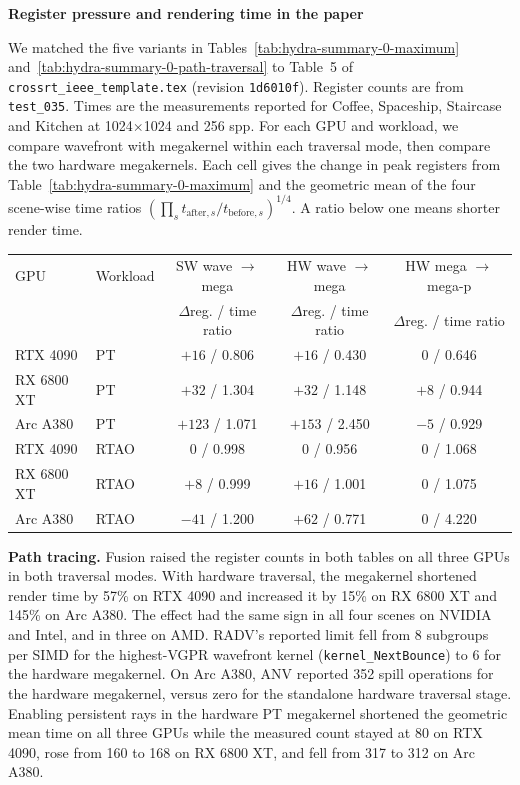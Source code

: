 \par\medskip
\noindent\textbf{Register pressure and rendering time in the paper}\par
We matched the five variants in Tables~\ref{tab:hydra-summary-0-maximum}
and~\ref{tab:hydra-summary-0-path-traversal} to Table~5 of
\texttt{crossrt\_ieee\_template.tex} (revision \texttt{1d6010f}). Register
counts are from \texttt{test\_035}. Times are the measurements reported
for Coffee, Spaceship, Staircase and Kitchen at 1024$\times$1024 and 256 spp.
For each GPU and workload, we compare wavefront with megakernel within each
traversal mode, then compare the two hardware megakernels. Each cell gives
the change in peak registers from Table~\ref{tab:hydra-summary-0-maximum}
and the geometric mean of the four scene-wise time ratios
$(\prod_s t_{\mathrm{after},s}/t_{\mathrm{before},s})^{1/4}$.
A ratio below one means shorter render time.

\begin{center}
\begin{tabular}{llccc}
\hline
GPU & Workload & SW wave $\to$ mega & HW wave $\to$ mega & HW mega $\to$ mega-p \\
    &          & $\Delta$reg. / time ratio & $\Delta$reg. / time ratio & $\Delta$reg. / time ratio \\
\hline
RTX 4090   & PT   & $+16$ / 0.806 & $+16$ / 0.430 & $0$ / 0.646 \\
RX 6800 XT & PT   & $+32$ / 1.304 & $+32$ / 1.148 & $+8$ / 0.944 \\
Arc A380   & PT   & $+123$ / 1.071 & $+153$ / 2.450 & $-5$ / 0.929 \\
\hline
RTX 4090   & RTAO & $0$ / 0.998 & $0$ / 0.956 & $0$ / 1.068 \\
RX 6800 XT & RTAO & $+8$ / 0.999 & $+16$ / 1.001 & $0$ / 1.075 \\
Arc A380   & RTAO & $-41$ / 1.200 & $+62$ / 0.771 & $0$ / 4.220 \\
\hline
\end{tabular}
\end{center}

\noindent\textbf{Path tracing.}
Fusion raised the register counts in both tables on all three GPUs in both
traversal modes. With hardware traversal, the megakernel shortened render
time by 57\% on RTX 4090 and increased it by 15\% on RX 6800 XT and 145\% on
Arc A380. The effect had the same sign in all four scenes on NVIDIA and Intel,
and in three on AMD. RADV's reported limit fell from 8 subgroups per SIMD for
the highest-VGPR wavefront kernel (\texttt{kernel\_NextBounce}) to 6 for the
hardware megakernel. On Arc A380, ANV reported 352 spill operations for the
hardware megakernel, versus zero for the standalone hardware traversal stage.
Enabling persistent rays in the hardware PT megakernel shortened the geometric
mean time on all three GPUs while the measured count stayed at 80 on RTX 4090,
rose from 160 to 168 on RX 6800 XT, and fell from 317 to 312 on Arc A380.

